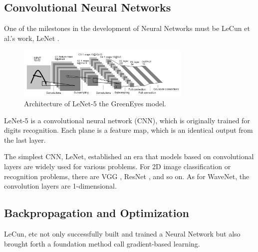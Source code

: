 \subsection{Convolutional Neural Networks}

One of the milestones in the development of Neural Networks must be LeCun et al.'s work, LeNet \cite{lecun1998gradient}.

\begin{figure}[!htbp]
    \centering
    \label{fig:LeNet5}
    \includegraphics[width=8.3cm]{fig/Survey/LeNet5.png}
    \caption{Architecture of LeNet-5 the GreenEyes model.}
\end{figure}

LeNet-5 is a convolutional neural network (CNN), which is originally trained for digits recognition. Each plane is a feature map, which is an identical output from the last layer.

The simplest CNN, LeNet, established an era that models based on convolutional layers are widely used for various problems. For 2D image classification or recognition problems, there are VGG \cite{simonyan2014very}, ResNet \cite{he2016deep}, and so on. As for WaveNet, the convolution layers are 1-dimensional.




\subsection{Backpropagation and Optimization}

LeCun, etc \cite{lecun1998gradient} not only successfully built and trained a Neural Network but also brought forth a foundation method call gradient-based learning.


